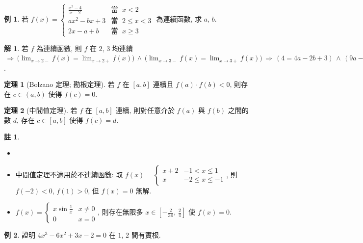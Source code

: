 \documentclass[12pt]{extarticle}
\newcommand{\ds}{\displaystyle}
\newcommand{\ie}{\,\Longrightarrow\,}
\theoremstyle{definition}
\newtheorem*{thm}{定理}
\newtheorem*{ex}{例}
\newtheorem*{sol}{解}
\newtheorem*{rmk}{註}
\begin{document}
\begin{ex}
  若 $\ds f(x) = \begin{cases}\frac{x^2 - 4}{x - 2} & \text{當 }\; x < 2 \\ a x^2 - b x + 3 & \text{當 }\; 2 \leqslant x < 3 \\ 2 x - a + b & \text{當 }\; x \geqslant 3 \end{cases}$ 為連續函數, 求 $a$, $b$. 
\end{ex}

\begin{sol}
  若 $f$ 為連續函數, 則 $f$ 在 $2$, $3$ 均連續 $\ds\ie \big(\lim_{x\to 2-}f(x) = \lim_{x\to 2+} f(x)\big) \,\wedge\, \big(\lim_{x\to 3-}f(x) = \lim_{x\to 3+} f(x)\big)\ie (4 = 4a - 2b + 3)\,\wedge\, (9a - 3b + 3 = 6 - a + b)\ie a = \frac{1}{2},\,\,b = \frac{1}{2}$. 
\end{sol}

\begin{thm}[Bolzano 定理; 勘根定理]
  若 $f$ 在 $[a, b]$ 連續且 $f(a)\cdot f(b) < 0$, 則存在 $c\in(a, b)$ 使得 $f(c) = 0$.   
\end{thm}

\begin{thm}[中間值定理]
  若 $f$ 在 $[a, b]$ 連續, 則對任意介於 $f(a)$ 與 $f(b)$ 之間的數 $d$, 存在 $c\in[a, b]$ 使得 $f(c) = d$.   
\end{thm}

\begin{rmk}%
  \begin{itemize}\setlength\itemsep{0em}
    \item[]
    \item 中間值定理不適用於不連續函數: 取 $\ds f(x) = \begin{cases}x + 2 & -1 < x \leqslant 1 \\ x & -2\leqslant x\leqslant -1\end{cases}$, 則 $f(-2) < 0$, $f(1) > 0$, 但 $f(x) = 0$ 無解. 
    \item $\ds f(x) = \begin{cases}x\sin\frac{1}{x}& x \ne 0 \\ 0 & x = 0\end{cases}$, 則存在無限多 $x\in[-\frac{2}{3\pi},\,\frac{2}{\pi}]$ 使 $f(x) = 0$. 
  \end{itemize}
\end{rmk}

\begin{ex}
  證明 $4x^3 - 6x^2 + 3x - 2 = 0$ 在 $1$, $2$ 間有實根. 
\end{ex}
\end{document}
